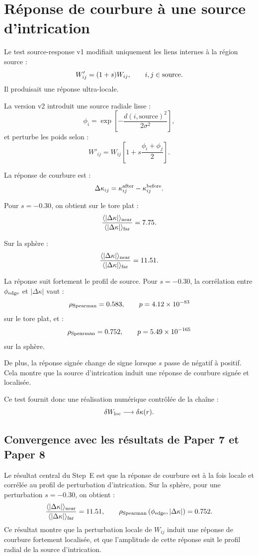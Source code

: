 \documentclass[11pt,a4paper]{article}
\begin{document}
\section{Réponse de courbure à une source d'intrication}

Le test source-response v1 modifiait uniquement les liens internes à la
région source :
\[
W'_{ij}=(1+s)W_{ij},
\qquad i,j\in{\rm source}.
\]
Il produisait une réponse ultra-locale.

La version v2 introduit une source radiale lisse :
\[
\phi_i
=
\exp\left[
-\frac{d(i,\mathrm{source})^2}{2\sigma^2}
\right],
\]
et perturbe les poids selon :
\[
W'_{ij}
=
W_{ij}
\left[
1+s\frac{\phi_i+\phi_j}{2}
\right].
\]

La réponse de courbure est :
\[
\Delta\kappa_{ij}
=
\kappa_{ij}^{\rm after}
-
\kappa_{ij}^{\rm before}.
\]

Pour \(s=-0.30\), on obtient sur le tore plat :
\[
\frac{
\langle|\Delta\kappa|\rangle_{\rm near}
}{
\langle|\Delta\kappa|\rangle_{\rm far}
}
=
7.75.
\]

Sur la sphère :
\[
\frac{
\langle|\Delta\kappa|\rangle_{\rm near}
}{
\langle|\Delta\kappa|\rangle_{\rm far}
}
=
11.51.
\]

La réponse suit fortement le profil de source. Pour \(s=-0.30\), la
corrélation entre \(\phi_{\rm edge}\) et \(|\Delta\kappa|\) vaut :
\[
\rho_{\rm Spearman}=0.583,
\qquad
p=4.12\times10^{-83}
\]
sur le tore plat, et :
\[
\rho_{\rm Spearman}=0.752,
\qquad
p=5.49\times10^{-165}
\]
sur la sphère.

De plus, la réponse signée change de signe lorsque \(s\) passe de négatif à
positif. Cela montre que la source d'intrication induit une réponse de
courbure signée et localisée.

Ce test fournit donc une réalisation numérique contrôlée de la chaîne :
\[
\delta W_{\rm loc}
\longrightarrow
\delta\kappa(r).
\]

\subsection{Convergence avec les résultats de Paper 7 et Paper 8}

Le résultat central du Step~E est que la réponse de courbure est à la fois
locale et corrélée au profil de perturbation d'intrication. Sur la sphère,
pour une perturbation \(s=-0.30\), on obtient :
\[
\frac{
\langle|\Delta\kappa|\rangle_{\rm near}
}{
\langle|\Delta\kappa|\rangle_{\rm far}
}
=
11.51,
\qquad
\rho_{\rm Spearman}
\left(
\phi_{\rm edge},
|\Delta\kappa|
\right)
=
0.752.
\]
Ce résultat montre que la perturbation locale de \(W_{ij}\) induit une réponse
de courbure fortement localisée, et que l'amplitude de cette réponse suit le
profil radial de la source d'intrication.
\end{document}
